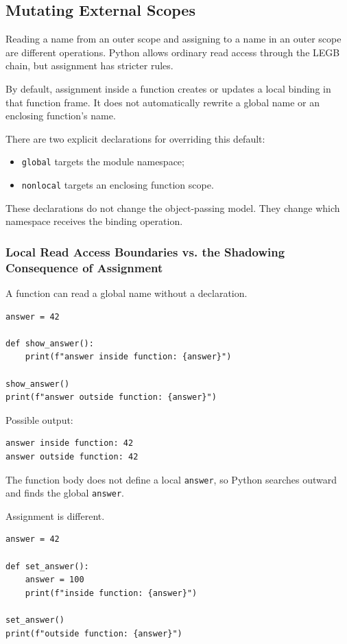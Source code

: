 \subsection{Mutating External Scopes}

Reading a name from an outer scope and assigning to a name in an outer scope are different operations. Python allows ordinary read access through the LEGB chain, but assignment has stricter rules.

By default, assignment inside a function creates or updates a local binding in that function frame. It does not automatically rewrite a global name or an enclosing function's name.

There are two explicit declarations for overriding this default:

\begin{itemize}
    \item \texttt{global} targets the module namespace;
    \item \texttt{nonlocal} targets an enclosing function scope.
\end{itemize}

These declarations do not change the object-passing model. They change which namespace receives the binding operation.

\subsubsection{Local Read Access Boundaries vs. the Shadowing Consequence of Assignment}

A function can read a global name without a declaration.

\begin{verbatim}
answer = 42

def show_answer():
    print(f"answer inside function: {answer}")

show_answer()
print(f"answer outside function: {answer}")
\end{verbatim}

Possible output:

\begin{verbatim}
answer inside function: 42
answer outside function: 42
\end{verbatim}

The function body does not define a local \texttt{answer}, so Python searches outward and finds the global \texttt{answer}.

Assignment is different.

\begin{verbatim}
answer = 42

def set_answer():
    answer = 100
    print(f"inside function: {answer}")

set_answer()
print(f"outside function: {answer}")
\end{verbatim}

